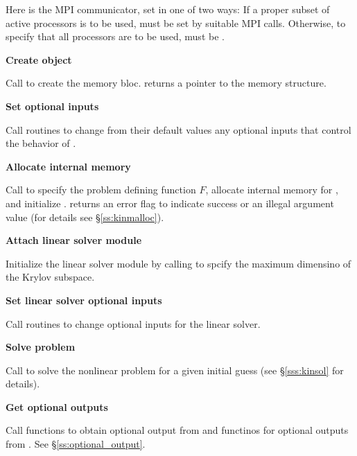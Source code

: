 \begin{Steps}
  {\s} 

  {\p} 

  Here  is the MPI communicator, set in one of two ways: 
  If a proper subset of active processors is to be used,  
  must be set by suitable MPI calls. Otherwise, to specify that all 
  processors are to be used,  must be .
  
\item\label{i:kinsol_create} 
  {\bf Create {\kinsol} object}

  Call  
  to create the {\kinsol} memory bloc.
   returns a pointer to the {\kinsol} memory structure.

\item
  {\bf Set optional inputs}

  Call  routines to change from their default values any
  optional inputs that control the behavior of {\kinsol}.

\item\label{i:kinsol_malloc} 
  {\bf Allocate internal memory}

  Call  
  to specify the problem defining function $F$,
  allocate internal memory for {\kinsol}, 
  and initialize {\kinsol}.
   returns an error flag to indicate success or an illegal argument value
  (for details see \S\ref{ss:kinmalloc}).

\item\label{i:lin_solver} 
  {\bf Attach linear solver module}

  Initialize the linear solver module by calling 
  to spcify the maximum dimensino of the Krylov subspace.

\item
  {\bf Set linear solver optional inputs}

  Call  routines to change optional inputs  
  for the {\kinspgmr} linear solver.

\item
  {\bf Solve problem}

  Call  to solve the nonlinear problem for a given
  initial guess (see \S\ref{sss:kinsol} for details).

\item
  {\bf Get optional outputs}

  Call  functions to obtain optional output from {\kinsol}
  and  functinos for optional outputs from {\kinspgmr}.
  See \S\ref{ss:optional_output}.


\end{Steps}
